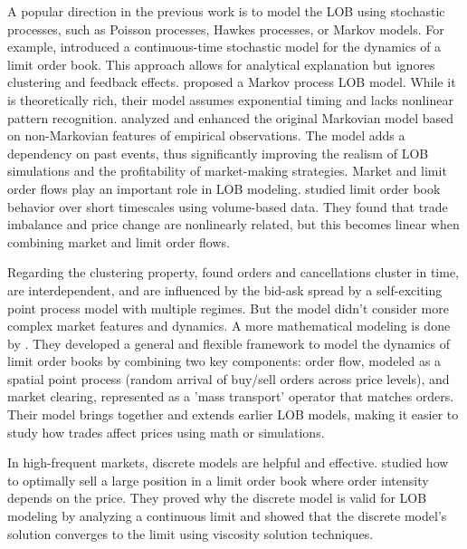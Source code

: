 A popular direction in the previous work is to model the LOB using stochastic processes, such as Poisson processes, Hawkes processes, or Markov models. For example, \cite{cont_stochastic_2010} introduced a continuous-time stochastic model for the dynamics of a limit order book. This approach allows for analytical explanation but ignores clustering and feedback effects. 
\cite{bleher_orders_2021} proposed a Markov process LOB model. While it is theoretically rich, their model assumes exponential timing and lacks nonlinear pattern recognition.
\cite{lu_order-book_2018} analyzed and enhanced the original Markovian model based on non-Markovian features of empirical observations. The model adds a dependency on past events, thus significantly improving the realism of LOB simulations and the profitability of market-making strategies. 
Market and limit order flows play an important role in LOB modeling. \cite{bechler2017orderflowslimitorder} studied limit order book behavior over short timescales using volume-based data. They found that trade imbalance and price change are nonlinearly related, but this becomes linear when combining market and limit order flows. 

Regarding the clustering property, \cite{vinkovskaya_point_nodate} found orders and cancellations cluster in time, are interdependent, and are influenced by the bid-ask spread by a self-exciting point process model with multiple regimes. But the model didn't consider more complex market features and dynamics.
A more mathematical modeling is done by \cite{cont_mathematical_2023}. They developed a general and flexible framework to model the dynamics of limit order books by combining two key components: order flow, modeled as a spatial point process (random arrival of buy/sell orders across price levels), and market clearing, represented as a 'mass transport' operator that matches orders. Their model brings together and extends earlier LOB models, making it easier to study how trades affect prices using math or simulations.

In high-frequent markets, discrete models are helpful and effective. \cite{bayraktar_liquidation_2012} studied how to optimally sell a large position in a limit order book where order intensity depends on the price. They proved why the discrete model is valid for LOB modeling by analyzing a continuous limit and showed that the discrete model's solution converges to the limit using viscosity solution techniques. 

